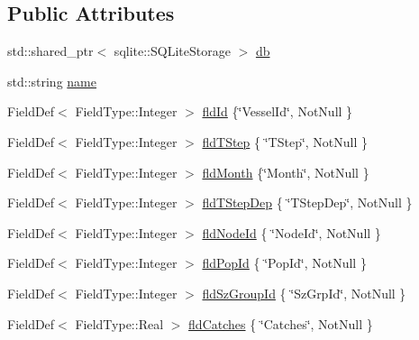 \subsection*{Public Attributes}
\begin{DoxyCompactItemize}
\item 
std\+::shared\+\_\+ptr$<$ sqlite\+::\+S\+Q\+Lite\+Storage $>$ \mbox{\hyperlink{struct_vessel_vms_like_f_pings_only_table_1_1_impl_a180feca1d1f690252e313c270202ca42}{db}}
\item 
std\+::string \mbox{\hyperlink{struct_vessel_vms_like_f_pings_only_table_1_1_impl_a28452263bbd6835bd6f033681a39ddc9}{name}}
\item 
Field\+Def$<$ Field\+Type\+::\+Integer $>$ \mbox{\hyperlink{struct_vessel_vms_like_f_pings_only_table_1_1_impl_af73eb376b1cef5f2c3533e15bd02d10f}{fld\+Id}} \{\char`\"{}Vessel\+Id\char`\"{}, Not\+Null \}
\item 
Field\+Def$<$ Field\+Type\+::\+Integer $>$ \mbox{\hyperlink{struct_vessel_vms_like_f_pings_only_table_1_1_impl_ab44c7a92d60077b3a8ed4cb58ba99962}{fld\+T\+Step}} \{ \char`\"{}T\+Step\char`\"{}, Not\+Null \}
\item 
Field\+Def$<$ Field\+Type\+::\+Integer $>$ \mbox{\hyperlink{struct_vessel_vms_like_f_pings_only_table_1_1_impl_a69548cc286384a7fa217ad5d28eb8db3}{fld\+Month}} \{\char`\"{}Month\char`\"{}, Not\+Null \}
\item 
Field\+Def$<$ Field\+Type\+::\+Integer $>$ \mbox{\hyperlink{struct_vessel_vms_like_f_pings_only_table_1_1_impl_af8e8160c7c7c7990ca22da85a8389eea}{fld\+T\+Step\+Dep}} \{ \char`\"{}T\+Step\+Dep\char`\"{}, Not\+Null \}
\item 
Field\+Def$<$ Field\+Type\+::\+Integer $>$ \mbox{\hyperlink{struct_vessel_vms_like_f_pings_only_table_1_1_impl_ad5ecf8bd2c86e503d68c816ce4e462ba}{fld\+Node\+Id}} \{ \char`\"{}Node\+Id\char`\"{}, Not\+Null \}
\item 
Field\+Def$<$ Field\+Type\+::\+Integer $>$ \mbox{\hyperlink{struct_vessel_vms_like_f_pings_only_table_1_1_impl_aa316c94f58fdc6dac6d0910580dde58c}{fld\+Pop\+Id}} \{ \char`\"{}Pop\+Id\char`\"{}, Not\+Null \}
\item 
Field\+Def$<$ Field\+Type\+::\+Integer $>$ \mbox{\hyperlink{struct_vessel_vms_like_f_pings_only_table_1_1_impl_a1cd399544e9f2db4025c18c2c06c20d0}{fld\+Sz\+Group\+Id}} \{ \char`\"{}Sz\+Grp\+Id\char`\"{}, Not\+Null \}
\item 
Field\+Def$<$ Field\+Type\+::\+Real $>$ \mbox{\hyperlink{struct_vessel_vms_like_f_pings_only_table_1_1_impl_a52c311e3ec42ee4ee51b959b401cf661}{fld\+Catches}} \{ \char`\"{}Catches\char`\"{}, Not\+Null \}

\end{DoxyCompactItemize}
